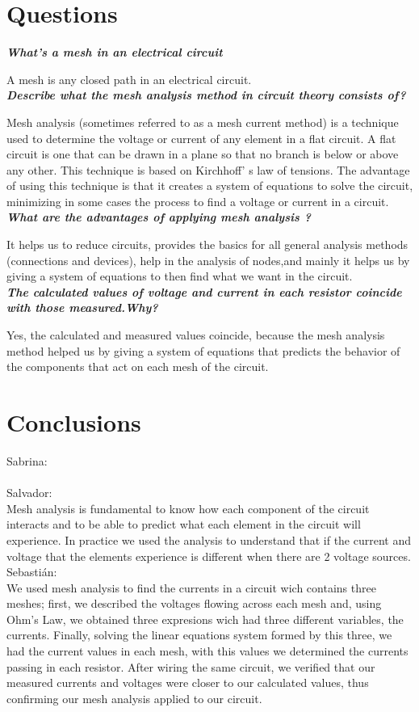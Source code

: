 \documentclass[letterpaper]{article}
\begin{document}
\section{Questions}
\textit{\textbf{What's a mesh in an electrical circuit}}

A mesh is any closed path in an electrical circuit.\\
\textit{\textbf{Describe what the mesh analysis method in circuit theory consists of?}}

Mesh analysis (sometimes referred to as a mesh current method) is a technique used to determine the voltage 
or current of any element in a flat circuit. A flat circuit is one that can be drawn in 
a plane so that no branch is below or above any other. This technique is based on Kirchhoff'
s law of tensions. The advantage of using this technique is that it creates a system of equations to 
solve the circuit, minimizing in some cases the process to find a voltage or current in a circuit.\\
\textit{\textbf{What are the advantages of applying mesh analysis ?}}

It helps us to reduce circuits, provides the basics for all general analysis methods (connections and devices), 
help in the analysis of nodes,and mainly it helps us by giving a system of equations to then find what we 
want in the circuit.\\
\textit{\textbf{The calculated values of voltage and current in each resistor coincide with those measured.Why?}}

Yes, the calculated and measured values coincide, because the mesh analysis method helped us by giving a system of equations that predicts the behavior of the components that act on each mesh of the circuit.
\section{Conclusions}
{\large Sabrina:}\\
%
\\[2ex]
{\large Salvador:}\\
Mesh analysis is fundamental to know how each component of the circuit interacts and to be able to predict 
what each element in the circuit will experience. In practice we used the analysis to understand that if 
the current and voltage that the elements experience is different when there are 2 voltage sources.
\\[2ex]
{\large Sebastián:}\\
We used mesh analysis to find the currents in a circuit wich contains three meshes; first, we
described the voltages flowing across each mesh and, using Ohm's Law, we obtained three expresions
wich had three different variables, the currents. Finally, solving the linear equations system
formed by this three, we had the current values in each mesh, with this values we determined the
currents passing in each resistor. After wiring the same circuit, we verified that our measured
currents and voltages were closer to our calculated values, thus confirming our mesh analysis
applied to our circuit.
\end{document}
